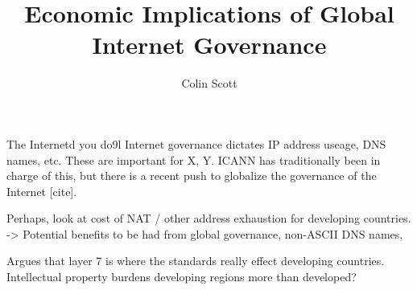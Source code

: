\documentclass[12pt]{article}
\title{Economic Implications of Global Internet Governance}
\author{
Colin Scott
}
\begin{document}
\maketitle

The Internetd you do9l
Internet governance dictates IP address useage, DNS names, etc. These are
important for X, Y. ICANN has traditionally been in charge of this, but there
is a recent push to globalize the governance of the Internet [cite].

Perhaps, look at cost of NAT / other address exhaustion for developing
countries. -> Potential benefits to be had from global governance, non-ASCII
DNS names, 

Argues that layer 7 is where the standards really effect developing countries.
Intellectual property burdens developing regions more than developed?



\end{document}
